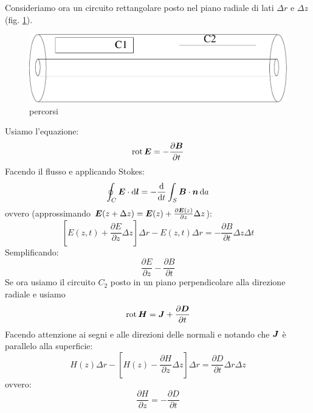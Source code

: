 Consideriamo ora un circuito rettangolare posto nel piano radiale di lati $\Delta r$ e $\Delta z$ (fig. \ref{coassiali_03}).
\begin{figure}[htbp]
\centering
\includegraphics[scale=0.5]{immagini/fisica2/coassiali_03}
\caption{percorsi}
\label{coassiali_03}
\end{figure}
Usiamo l'equazione:
\begin{equation}
\operatorname{rot}\boldsymbol{E}=-\frac{\partial\boldsymbol{B}}{\partial t}
\end{equation}
Facendo il flusso e applicando Stokes:
\begin{equation}
\oint_{C}\boldsymbol{E}\cdot\mathrm{d} \boldsymbol{l}=-\frac{\mathrm{d}}{\mathrm{d} t}\int_{S}\boldsymbol{B}\cdot\boldsymbol{n}\,\mathrm{d} a
\end{equation}
ovvero (approssimando $\boldsymbol{E}(z+\Delta z)=\boldsymbol{E}(z)+\frac{\partial\boldsymbol{E}(z)}{\partial z}\Delta z$):
\begin{equation}
\left[E(z,t)+\frac{\partial E}{\partial z}\Delta z\right]\Delta r-E(z,t)\Delta r=-\frac{\partial B}{\partial t}\Delta z\Delta t
\end{equation}
Semplificando:
\begin{equation}
\frac{\partial E}{\partial z}-\frac{\partial B}{\partial t}
\label{coa_dif1}
\end{equation}
Se ora usiamo il circuito $C_2$ posto in un piano perpendicolare alla direzione radiale e usiamo
\begin{equation}
\operatorname{rot} \boldsymbol{H}=\boldsymbol{J}+\frac{\partial \boldsymbol{D}}{\partial t}
\end{equation}
Facendo attenzione ai segni e alle direzioni delle normali e notando che $\boldsymbol{J}$ è parallelo alla superficie:
\begin{equation}
H(z)\Delta r-\left[H(z)-\frac{\partial H}{\partial z}\Delta z\right]\Delta r=\frac{\partial D}{\partial t}\Delta r\Delta z
\end{equation}
ovvero:
\begin{equation}
\frac{\partial H}{\partial z}=-\frac{\partial D}{\partial t}
\label{coa_dif2}
\end{equation}

